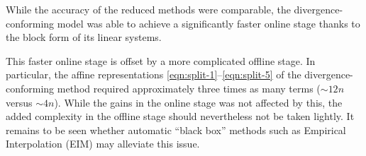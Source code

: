 \documentclass[onecolumn, twoside, a4paper, 11pt]{article}
\begin{document}
While the accuracy of the reduced methods were comparable, the
divergence-conforming model was able to achieve a significantly faster online
stage thanks to the block form of its linear systems.

This faster online stage is offset by a more complicated offline stage. In
particular, the affine representations \eqref{eqn:split-1}--\eqref{eqn:split-5}
of the divergence-conforming method required approximately three times as many
terms ($\sim 12n$ versus $\sim 4n$). While the gains in the online stage was not
affected by this, the added complexity in the offline stage should nevertheless
not be taken lightly. It remains to be seen whether automatic ``black box''
methods such as Empirical Interpolation (EIM)
\cite{Barrault2004eim,Grepl2007erb,Maday2007gmi}
\cite[Chapter 10]{Quarteroni2016rbm}
may alleviate this issue.



\end{document}
